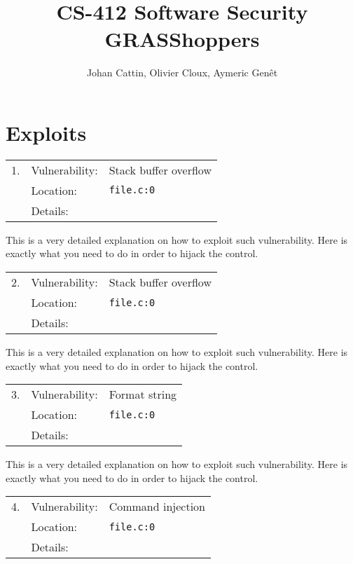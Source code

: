 \documentclass[11pt]{article}
\begin{document}
\author{Johan Cattin, Olivier Cloux, Aymeric Gen\^{e}t}
\title{CS-412 Software Security \\ \Huge GRASShoppers}
\maketitle

\section*{Exploits}

\begin{tabular}{lll}
	1. & Vulnerability: & Stack buffer overflow \\
	   & Location:      & \texttt{file.c:0} \\
	   & Details:       & \\
\end{tabular}

This is a very detailed explanation on how to exploit such vulnerability.
Here is exactly what you need to do in order to hijack the control.

\vspace{5mm}\noindent
\begin{tabular}{lll}
	2. & Vulnerability: & Stack buffer overflow \\
	   & Location:      & \texttt{file.c:0} \\
	   & Details:       & \\
\end{tabular}

This is a very detailed explanation on how to exploit such vulnerability.
Here is exactly what you need to do in order to hijack the control.

\vspace{5mm}\noindent
\begin{tabular}{lll}
	3. & Vulnerability: & Format string \\
	   & Location:      & \texttt{file.c:0} \\
	   & Details:       & \\
\end{tabular}

This is a very detailed explanation on how to exploit such vulnerability.
Here is exactly what you need to do in order to hijack the control.

\vspace{5mm}\noindent
\begin{tabular}{lll}
	4. & Vulnerability: & Command injection \\
	   & Location:      & \texttt{file.c:0} \\
	   & Details:       & \\
\end{tabular}
\end{document}
